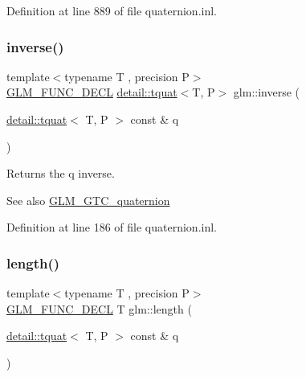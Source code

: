 Definition at line 889 of file quaternion.\+inl.

\mbox{\label{group__gtc__quaternion_ga6613ef61cb980a18f19ece5f421564da}} 
\subsubsection{\texorpdfstring{inverse()}{inverse()}}
{\footnotesize\ttfamily template$<$typename T , precision P$>$ \\
\hyperlink{setup_8hpp_ab2d052de21a70539923e9bcbf6e83a51}{G\+L\+M\+\_\+\+F\+U\+N\+C\+\_\+\+D\+E\+CL} \hyperlink{structglm_1_1detail_1_1tquat}{detail\+::tquat}$<$T, P$>$ glm\+::inverse (\begin{DoxyParamCaption}\item[{\hyperlink{structglm_1_1detail_1_1tquat}{detail\+::tquat}$<$ T, P $>$ const \&}]{q }\end{DoxyParamCaption})}

Returns the q inverse.

\begin{DoxySeeAlso}{See also}
\hyperlink{group__gtc__quaternion}{G\+L\+M\+\_\+\+G\+T\+C\+\_\+quaternion} 
\end{DoxySeeAlso}


Definition at line 186 of file quaternion.\+inl.

\mbox{\label{group__gtc__quaternion_ga3406ab83e2cafd4034f359957e942410}} 
\subsubsection{\texorpdfstring{length()}{length()}}
{\footnotesize\ttfamily template$<$typename T , precision P$>$ \\
\hyperlink{setup_8hpp_ab2d052de21a70539923e9bcbf6e83a51}{G\+L\+M\+\_\+\+F\+U\+N\+C\+\_\+\+D\+E\+CL} T glm\+::length (\begin{DoxyParamCaption}\item[{\hyperlink{structglm_1_1detail_1_1tquat}{detail\+::tquat}$<$ T, P $>$ const \&}]{q }\end{DoxyParamCaption})}

